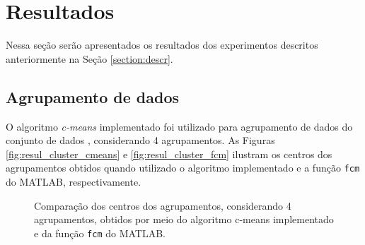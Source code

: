 \documentclass[12pt,a4paper]{article}
\numberwithin{equation}{section}
\begin{document}
{%
\section{Resultados}

Nessa seção serão apresentados os resultados dos experimentos descritos anteriormente na Seção \ref{section:descr}.

\subsection{Agrupamento de dados}

O algoritmo \textit{c-means} implementado foi utilizado para agrupamento de dados do conjunto de dados , considerando 4 agrupamentos. As Figuras \ref{fig:resul_cluster_cmeans} e \ref{fig:resul_cluster_fcm} ilustram os centros dos agrupamentos obtidos quando utilizado o algoritmo implementado e a função \texttt{fcm} do MATLAB, respectivamente.

\begin{figure}[!htbp]
	\centering
	\caption{Comparação dos centros dos agrupamentos, considerando 4 agrupamentos, obtidos por meio do algoritmo c-means implementado e da função \texttt{fcm} do MATLAB.}
\end{figure}

}
\end{document}
